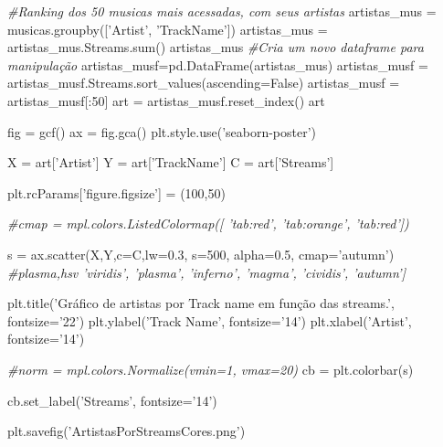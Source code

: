 \documentclass[11pt]{article}
\newenvironment{Shaded}{}{}
\newcommand{\DecValTok}[1]{\textcolor[rgb]{0.25,0.63,0.44}{{#1}}}
\newcommand{\FloatTok}[1]{\textcolor[rgb]{0.25,0.63,0.44}{{#1}}}
\newcommand{\StringTok}[1]{\textcolor[rgb]{0.25,0.44,0.63}{{#1}}}
\newcommand{\CommentTok}[1]{\textcolor[rgb]{0.38,0.63,0.69}{\textit{{#1}}}}
\newcommand{\NormalTok}[1]{{#1}}
\newcommand{\VariableTok}[1]{\textcolor[rgb]{0.10,0.09,0.49}{{#1}}}
\newcommand{\OperatorTok}[1]{\textcolor[rgb]{0.40,0.40,0.40}{{#1}}}
\newcommand{\BuiltInTok}[1]{{#1}}
\begin{document}
\begin{Shaded}
\begin{Highlighting}[]

\CommentTok{#Ranking dos 50 musicas mais acessadas, com seus artistas}
\NormalTok{artistas_mus }\OperatorTok{=}\NormalTok{ musicas.groupby([}\StringTok{'Artist'}\NormalTok{, }\StringTok{'TrackName'}\NormalTok{])}
\NormalTok{artistas_mus }\OperatorTok{=}\NormalTok{ artistas_mus.Streams.}\BuiltInTok{sum}\NormalTok{()}
\NormalTok{artistas_mus}
\CommentTok{#Cria um novo dataframe para manipulação}
\NormalTok{artistas_musf}\OperatorTok{=}\NormalTok{pd.DataFrame(artistas_mus)}
\NormalTok{artistas_musf }\OperatorTok{=}\NormalTok{ artistas_musf.Streams.sort_values(ascending}\OperatorTok{=}\VariableTok{False}\NormalTok{)}
\NormalTok{artistas_musf }\OperatorTok{=}\NormalTok{ artistas_musf[:}\DecValTok{50}\NormalTok{]}
\NormalTok{art }\OperatorTok{=}\NormalTok{ artistas_musf.reset_index()}
\NormalTok{art}

\NormalTok{fig }\OperatorTok{=}\NormalTok{ gcf()}
\NormalTok{ax }\OperatorTok{=}\NormalTok{ fig.gca()}
\NormalTok{plt.style.use(}\StringTok{'seaborn-poster'}\NormalTok{)}

\NormalTok{X }\OperatorTok{=}\NormalTok{ art[}\StringTok{'Artist'}\NormalTok{]}
\NormalTok{Y }\OperatorTok{=}\NormalTok{ art[}\StringTok{'TrackName'}\NormalTok{]}
\NormalTok{C }\OperatorTok{=}\NormalTok{ art[}\StringTok{'Streams'}\NormalTok{]}

\NormalTok{plt.rcParams[}\StringTok{'figure.figsize'}\NormalTok{] }\OperatorTok{=}\NormalTok{ (}\DecValTok{100}\NormalTok{,}\DecValTok{50}\NormalTok{)}

\CommentTok{#cmap = mpl.colors.ListedColormap([ 'tab:red', 'tab:orange',  'tab:red'])}


\NormalTok{s }\OperatorTok{=}\NormalTok{ ax.scatter(X,Y,c}\OperatorTok{=}\NormalTok{C,lw}\OperatorTok{=}\FloatTok{0.3}\NormalTok{, s}\OperatorTok{=}\DecValTok{500}\NormalTok{, alpha}\OperatorTok{=}\FloatTok{0.5}\NormalTok{,  cmap}\OperatorTok{=}\StringTok{'autumn'}\NormalTok{) }\CommentTok{#plasma,hsv  'viridis', 'plasma', 'inferno', 'magma', 'cividis', 'autumn']}

\NormalTok{plt.title(}\StringTok{'Gráfico de artistas por Track name em função das streams.'}\NormalTok{, fontsize}\OperatorTok{=}\StringTok{'22'}\NormalTok{)}
\NormalTok{plt.ylabel(}\StringTok{'Track Name'}\NormalTok{, fontsize}\OperatorTok{=}\StringTok{'14'}\NormalTok{)}
\NormalTok{plt.xlabel(}\StringTok{'Artist'}\NormalTok{, fontsize}\OperatorTok{=}\StringTok{'14'}\NormalTok{)}


\CommentTok{#norm = mpl.colors.Normalize(vmin=1, vmax=20)}
\NormalTok{cb }\OperatorTok{=}\NormalTok{ plt.colorbar(s)}

\NormalTok{cb.set_label(}\StringTok{'Streams'}\NormalTok{, fontsize}\OperatorTok{=}\StringTok{'14'}\NormalTok{)}


\NormalTok{plt.savefig(}\StringTok{'ArtistasPorStreamsCores.png'}\NormalTok{) }
\end{Highlighting}
\end{Shaded}
\end{document}
